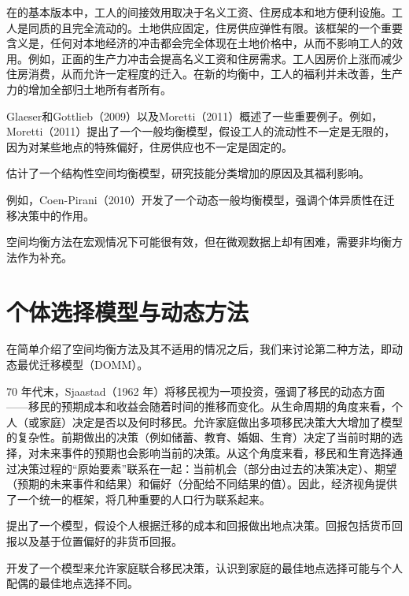 \documentclass[a4paper,12pt,oneside]{book} %
\begin{document}
在\cite{robackWagesRentsQuality1982}的基本版本中，工人的间接效用取决于名义工资、住房成本和地方便利设施。工人是同质的且完全流动的。土地供应固定，住房供应弹性有限。该框架的一个重要含义是，任何对本地经济的冲击都会完全体现在土地价格中，从而不影响工人的效用。例如，正面的生产力冲击会提高名义工资和住房需求。工人因房价上涨而减少住房消费，从而允许一定程度的迁入。在新的均衡中，工人的福利并未改善，生产力的增加全部归土地所有者所有。

Glaeser和Gottlieb（2009）以及Moretti（2011）概述了一些重要例子。例如，Moretti（2011）提出了一个一般均衡模型，假设工人的流动性不一定是无限的，因为对某些地点的特殊偏好，住房供应也不一定是固定的。

\cite{diamondDeterminantsWelfareImplications2016}估计了一个结构性空间均衡模型，研究技能分类增加的原因及其福利影响。

例如，Coen-Pirani（2010）开发了一个动态一般均衡模型，强调个体异质性在迁移决策中的作用。

\cite{LiuHuaRenLiZiBenKongJianPeiZhiDeSheHuiFuLiXiaoYingYanJiuJiYuLiangHuaKongJianYiBanJunHengMoXingDeFenXi2024}

\cite{WangLiLiLaoDongLiLiuDongDuiChengShiGongZiYuFuLiDeYingXiangJiYuKongJianJunHengMoXingDeFenXi2024}

空间均衡方法在宏观情况下可能很有效，但在微观数据上却有困难，需要非均衡方法作为补充。



\section{个体选择模型与动态方法}
在简单介绍了空间均衡方法及其不适用的情况之后，我们来讨论第二种方法，即动态最优迁移模型（DOMM）。

70 年代末，Sjaastad（1962 年）将移民视为一项投资，强调了移民的动态方面——移民的预期成本和收益会随着时间的推移而变化。从生命周期的角度来看，个人（或家庭）决定是否以及何时移民。允许家庭做出多项移民决策大大增加了模型的复杂性。前期做出的决策（例如储蓄、教育、婚姻、生育）决定了当前时期的选择，对未来事件的预期也会影响当前的决策。从这个角度来看，移民和生育选择通过决策过程的“原始要素”联系在一起：当前机会（部分由过去的决策决定）、期望（预期的未来事件和结果）和偏好（分配给不同结果的值）。因此，经济视角提供了一个统一的框架，将几种重要的人口行为联系起来。

\cite{sjaastadCostsReturnsHuman1962} 提出了一个模型，假设个人根据迁移的成本和回报做出地点决策。回报包括货币回报以及基于位置偏好的非货币回报。

\cite{mincerFamilyMigrationDecisions1978} 开发了一个模型来允许家庭联合移民决策，认识到家庭的最佳地点选择可能与个人配偶的最佳地点选择不同。
\end{document}
